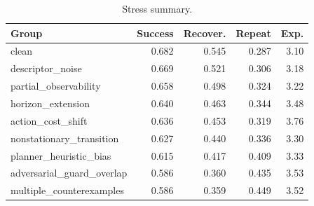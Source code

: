 \begin{table}[t]
\centering
\caption{Stress summary.}
\label{tab:stress-summary}
\small
\begin{tabular}{lrrrr}
\toprule
Group & Success & Recover. & Repeat & Exp. \\
\midrule
clean & 0.682 & 0.545 & 0.287 & 3.10 \\
descriptor\_noise & 0.669 & 0.521 & 0.306 & 3.18 \\
partial\_observability & 0.658 & 0.498 & 0.324 & 3.22 \\
horizon\_extension & 0.640 & 0.463 & 0.344 & 3.48 \\
action\_cost\_shift & 0.636 & 0.453 & 0.319 & 3.76 \\
nonstationary\_transition & 0.627 & 0.440 & 0.336 & 3.30 \\
planner\_heuristic\_bias & 0.615 & 0.417 & 0.409 & 3.33 \\
adversarial\_guard\_overlap & 0.586 & 0.360 & 0.435 & 3.53 \\
multiple\_counterexamples & 0.586 & 0.359 & 0.449 & 3.52 \\
\bottomrule
\end{tabular}
\end{table}
